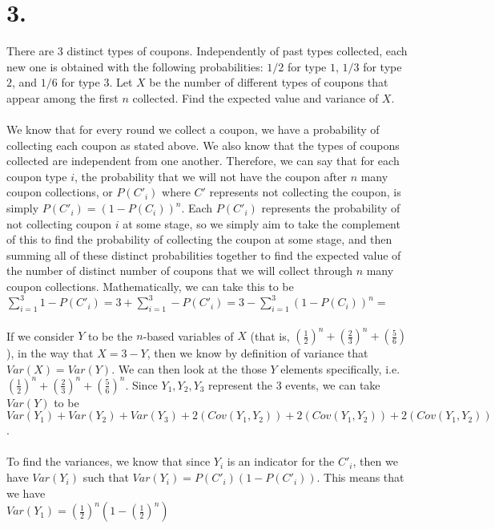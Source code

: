 \documentclass{article}
\begin{document}
\section*{3.}
{\Large 

There are 3 distinct types of coupons. Independently
of past types collected, each new one is obtained with the following probabilities: $1/2$ for type $1$, $1/3$ for type $2$, and $1/6$ for type $3$. Let $X$ be the number of different types of coupons that appear among the first $n$ collected. Find the expected value and variance of $X$. \\ \\
We know that for every round we collect a coupon, we have a probability of collecting each coupon as stated above. We also know that the types of coupons collected are independent from one another. Therefore, we can say that for each coupon type $i$, the probability that we will not have the coupon after $n$ many coupon collections, or $P(C'_i)$ where $C'$ represents not collecting the coupon, is simply $P(C'_i) = (1-P(C_i))^n$. Each $P(C'_i)$ represents the probability of not collecting coupon $i$ at some stage, so we simply aim to take the complement of this to find the probability of collecting the coupon at some stage, and then summing all of these distinct probabilities together to find the expected value of the number of distinct number of coupons that we will collect through $n$ many coupon collections. Mathematically, we can take this to be $\sum_{i = 1}^{3} 1 - P(C'_i) = 3 + \sum_{i=1}^{3} - P(C'_i) = 3 - \sum_{i=1}^{3} (1 - P(C_i))^n = $  \\ \\ 
If we consider $Y$ to be the $n$-based variables of $X$ (that is, $(\frac{1}{2})^n + (\frac{2}{3})^n + (\frac{5}{6})$), in the way that $X = 3 - Y$, then we know by definition of variance that $Var(X) = Var(Y)$. We can then look at the those $Y$ elements specifically, i.e. $(\frac{1}{2})^n + (\frac{2}{3})^n + (\frac{5}{6})^n$. Since $Y_1, Y_2, Y_3$ represent the 3 events, we can take $Var(Y)$ to be $Var(Y_1) + Var(Y_2) + Var(Y_3) + 2(Cov(Y_1, Y_2)) + 2(Cov(Y_1, Y_2)) + 2(Cov(Y_1, Y_2))$. \\ \\
To find the variances, we know that since $Y_i$ is an indicator for the $C'_i$, then we have $Var(Y_i)$ such that $Var(Y_i) = P(C'_i)(1 - P(C'_i))$. This means that we have \\
$Var(Y_1) = (\frac{1}{2})^n(1-(\frac{1}{2})^n)$ \\ 
}
\end{document}
